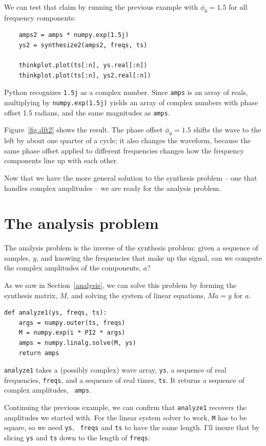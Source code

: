 \documentclass[12pt]{book}
\begin{document}
We can test that claim by running the previous example with
$\phi_0 = 1.5$ for all frequency components:

\begin{verbatim}
    amps2 = amps * numpy.exp(1.5j)
    ys2 = synthesize2(amps2, freqs, ts)

    thinkplot.plot(ts[:n], ys.real[:n])
    thinkplot.plot(ts[:n], ys2.real[:n])
\end{verbatim}

Python recognizes {\tt 1.5j} as a complex number.  Since {\tt amps}
is an array of reals, multiplying by {\tt numpy.exp(1.5j)} yields
an array of complex numbers with phase offset 1.5 radians, and
the same magnitudes as {\tt amps}.

Figure~\ref{fig.dft2} shows the result.  The phase offset
$\phi_0 = 1.5$ shifts the wave to the left by about one quarter of
a cycle; it also changes the waveform, because the same phase
offset applied to different frequencies changes how the frequency
components line up with each other.

Now that we have the more general solution to the synthesis problem --
one that handles complex amplitudes -- we are ready for the analysis
problem.


\section{The analysis problem}

The analysis problem is the inverse of the synthesis problem: given a
sequence of samples, $y$, and knowing the frequencies
that make up the signal, can we compute the complex amplitudes of the
components, $a$?

As we saw in Section~\ref{analysis}, we can solve this problem by forming
the synthesis matrix, $M$, and solving the system of linear
equations, $M a = y$ for $a$.

\begin{verbatim}
def analyze1(ys, freqs, ts):
    args = numpy.outer(ts, freqs)
    M = numpy.exp(i * PI2 * args)
    amps = numpy.linalg.solve(M, ys)
    return amps
\end{verbatim}

{\tt analyze1} takes a (possibly complex) wave array, {\tt ys}, a
sequence of real frequencies, {\tt freqs}, and a sequence of real
times, {\tt ts}.  It returns a sequence of complex amplitudes, {\tt
  amps}.

Continuing the previous example, we can confirm that {\tt analyze1}
recovers the amplitudes we started with.  For the linear system
solver to work, {\tt M} has to be square, so we need {\tt ys}, {\tt
  freqs} and {\tt ts} to have the same length.  I'll insure that by
slicing {\tt ys} and {\tt ts} down to the length of {\tt freqs}:
\end{document}

